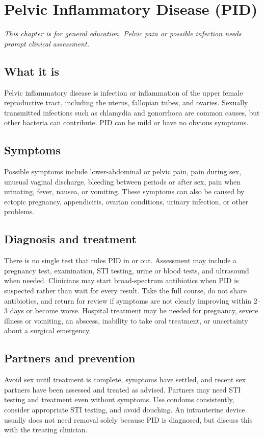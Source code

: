 \chapter{Pelvic Inflammatory Disease (PID)}

\medskip
\noindent\textit{This chapter is for general education. Pelvic pain or possible infection needs prompt clinical assessment.}

\section*{What it is}
Pelvic inflammatory disease is infection or inflammation of the upper female reproductive tract, including the uterus, fallopian tubes, and ovaries. Sexually transmitted infections such as chlamydia and gonorrhoea are common causes, but other bacteria can contribute. PID can be mild or have no obvious symptoms.

\section*{Symptoms}
Possible symptoms include lower-abdominal or pelvic pain, pain during sex, unusual vaginal discharge, bleeding between periods or after sex, pain when urinating, fever, nausea, or vomiting. These symptoms can also be caused by ectopic pregnancy, appendicitis, ovarian conditions, urinary infection, or other problems.

\section*{Diagnosis and treatment}
There is no single test that rules PID in or out. Assessment may include a pregnancy test, examination, STI testing, urine or blood tests, and ultrasound when needed. Clinicians may start broad-spectrum antibiotics when PID is suspected rather than wait for every result. Take the full course, do not share antibiotics, and return for review if symptoms are not clearly improving within 2--3 days or become worse. Hospital treatment may be needed for pregnancy, severe illness or vomiting, an abscess, inability to take oral treatment, or uncertainty about a surgical emergency.

\section*{Partners and prevention}
Avoid sex until treatment is complete, symptoms have settled, and recent sex partners have been assessed and treated as advised. Partners may need STI testing and treatment even without symptoms. Use condoms consistently, consider appropriate STI testing, and avoid douching. An intrauterine device usually does not need removal solely because PID is diagnosed, but discuss this with the treating clinician.

